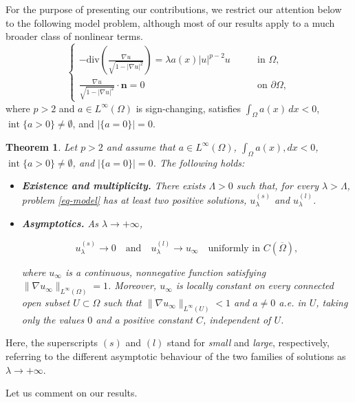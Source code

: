 \documentclass[11pt,reqno]{amsart}
\theoremstyle{plain}
\newtheorem{theorem}{Theorem}[section]
\theoremstyle{definition}
\numberwithin{equation}{section}
\begin{document}
For the purpose of presenting our contributions, we restrict our attention below to the following model problem, although most of our results apply to a much broader class of nonlinear terms.
\begin{equation}\label{eq-model}
\begin{cases}
\displaystyle -\text{div}\left( \frac{\nabla u}{\sqrt{ 1 - |\nabla u|^2}} \right) = \lambda a(x)|u|^{p-2}u \qquad &\mbox{in }{\Omega},\\
\frac{\nabla u}{\sqrt{ 1 - |\nabla u|^2}} \cdot \mathbf{n}=0 &\mbox{on }{\partial\Omega},
\end{cases}
\end{equation}
where $p > 2$ and $a \in L^\infty(\Omega)$ is sign-changing, satisfies $\int_\Omega a(x)\,dx<0$, $\operatorname{int}\{a>0\}\neq\emptyset$, and $|\{a=0\}|=0$.

\begin{theorem}\label{thm:intro}
Let $p>2$ and assume that $a\in L^\infty(\Omega)$, $\int_\Omega a(x),dx<0$, $\operatorname{int}\{a>0\}\neq\emptyset$, and $|\{a=0\}|=0$. The following holds:
\begin{itemize}
\item \textbf{Existence and multiplicity.} There exists $\Lambda>0$ such that, for every $\lambda>\Lambda$, problem \eqref{eq-model} has at least two positive solutions, $u_\lambda^{(s)}$ and $u_{\lambda}^{(l)}$.
\item \textbf{Asymptotics.} As $\lambda\to+\infty$,

$$
u_\lambda^{(s)} \to 0 \quad \text{and} \quad u_{\lambda}^{(l)} \to u_\infty \quad \text{uniformly in } C(\overline{\Omega}),
$$

where $u_\infty$ is a continuous, nonnegative function satisfying $\|\nabla u_\infty\|_{L^\infty(\Omega)}=1$. Moreover, $u_\infty$ is locally constant on every connected open subset $U \subset \Omega$ such that $\| \nabla u_\infty \|_{L^{\infty}(U)}<1$ and $a \not= 0$ a.e. in $U$, taking only the values $0$ and a positive constant $C$, independent of $U$.
\end{itemize}
\end{theorem}

Here, the superscripts $(s)$ and $(l)$ stand for \emph{small} and \emph{large}, respectively, referring to the different asymptotic behaviour of the two families of solutions as $\lambda\to+\infty$.

Let us comment on our results.
\end{document}
